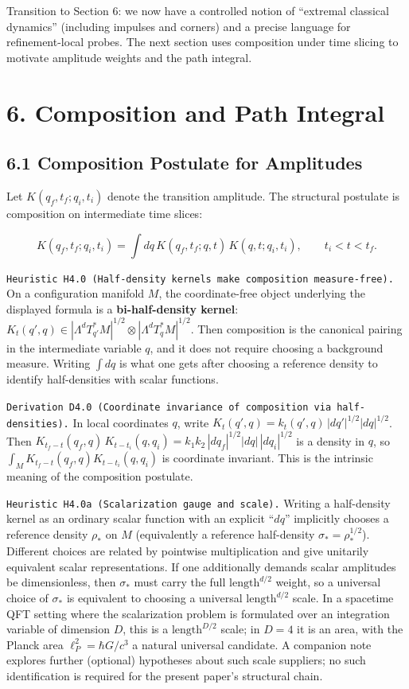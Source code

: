 \documentclass[
]{article}
\begin{document}
Transition to Section 6: we now have a controlled notion of ``extremal
classical dynamics'' (including impulses and corners) and a precise
language for refinement-local probes. The next section uses composition
under time slicing to motivate amplitude weights and the path integral.

\section{6. Composition and Path
Integral}\label{composition-and-path-integral}

\subsection{6.1 Composition Postulate for
Amplitudes}\label{composition-postulate-for-amplitudes}

Let \(K(q_f,t_f;q_i,t_i)\) denote the transition amplitude. The
structural postulate is composition on intermediate time slices:

\[
K(q_f,t_f;q_i,t_i)
=\int dq\,K(q_f,t_f;q,t)\,K(q,t;q_i,t_i),
\qquad t_i<t<t_f.
\]

\texttt{Heuristic\ H4.0\ (Half-density\ kernels\ make\ composition\ measure-free).}
On a configuration manifold \(M\), the coordinate-free object underlying
the displayed formula is a \textbf{bi-half-density kernel}:
\(K_t(q',q)\in|\Lambda^dT^\ast_{q'}M|^{1/2}\otimes|\Lambda^dT^\ast_qM|^{1/2}\).
Then composition is the canonical pairing in the intermediate variable
\(q\), and it does not require choosing a background measure. Writing
\(\int dq\) is what one gets after choosing a reference density to
identify half-densities with scalar functions.

\texttt{Derivation\ D4.0\ (Coordinate\ invariance\ of\ composition\ via\ half-densities).}
In local coordinates \(q\), write
\(K_t(q',q)=k_t(q',q)\,|dq'|^{1/2}|dq|^{1/2}\). Then
\(K_{t_f-t}(q_f,q)\,K_{t-t_i}(q,q_i)
=k_1k_2\,|dq_f|^{1/2}|dq|\,|dq_i|^{1/2}\) is a density in \(q\), so
\(\int_M K_{t_f-t}(q_f,q)K_{t-t_i}(q,q_i)\) is coordinate invariant.
This is the intrinsic meaning of the composition postulate.

\texttt{Heuristic\ H4.0a\ (Scalarization\ gauge\ and\ scale).} Writing a
half-density kernel as an ordinary scalar function with an explicit
``\(dq\)'' implicitly chooses a reference density \(\rho_\ast\) on \(M\)
(equivalently a reference half-density \(\sigma_\ast=\rho_\ast^{1/2}\)).
Different choices are related by pointwise multiplication and give
unitarily equivalent scalar representations. If one additionally demands
scalar amplitudes be dimensionless, then \(\sigma_\ast\) must carry the
full \(\text{length}^{d/2}\) weight, so a universal choice of
\(\sigma_\ast\) is equivalent to choosing a universal
\(\text{length}^{d/2}\) scale. In a spacetime QFT setting where the
scalarization problem is formulated over an integration variable of
dimension \(D\), this is a \(\text{length}^{D/2}\) scale; in \(D=4\) it
is an area, with the Planck area \(\ell_P^2=\hbar G/c^3\) a natural
universal candidate. A companion note explores further (optional)
hypotheses about such scale suppliers; no such identification is
required for the present paper's structural chain.
\end{document}
